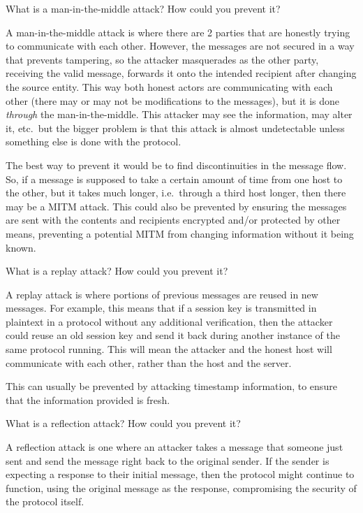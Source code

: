 \begin{questions}
\question{} What is a man-in-the-middle attack? How could you prevent it?
  \begin{solution}
    A man-in-the-middle attack is where there are 2 parties that are honestly trying to communicate with each other.
    However, the messages are not secured in a way that prevents tampering, so the attacker masquerades as the other party, receiving the valid message, forwards it onto the intended recipient after changing the source entity.
    This way both honest actors are communicating with each other (there may or may not be modifications to the messages), but it is done \emph{through} the man-in-the-middle.
    This attacker may see the information, may alter it, etc.\ but the bigger problem is that this attack is almost undetectable unless something else is done with the protocol.

    The best way to prevent it would be to find discontinuities in the message flow.
    So, if a message is supposed to take a certain amount of time from one host to the other, but it takes much longer, i.e.\ through a third host longer, then there may be a MITM attack.
    This could also be prevented by ensuring the messages are sent with the contents and recipients encrypted and/or protected by other means, preventing a potential MITM from changing information without it being known.
  \end{solution}

\question{} What is a replay attack? How could you prevent it?
  \begin{solution}
    A replay attack is where portions of previous messages are reused in new messages.
    For example, this means that if a session key is transmitted in plaintext in a protocol without any additional verification, then the attacker could reuse an old session key and send it back during another instance of the same protocol running.
    This will mean the attacker and the honest host will communicate with each other, rather than the host and the server.

    This can usually be prevented by attacking timestamp information, to ensure that the information provided is fresh.
  \end{solution}

\question{} What is a reflection attack? How could you prevent it?
  \begin{solution}
    A reflection attack is one where an attacker takes a message that someone just sent and send the message right back to the original sender.
    If the sender is expecting a response to their initial message, then the protocol might continue to function, using the original message as the response, compromising the security of the protocol itself.


\end{solution}
\end{questions}
